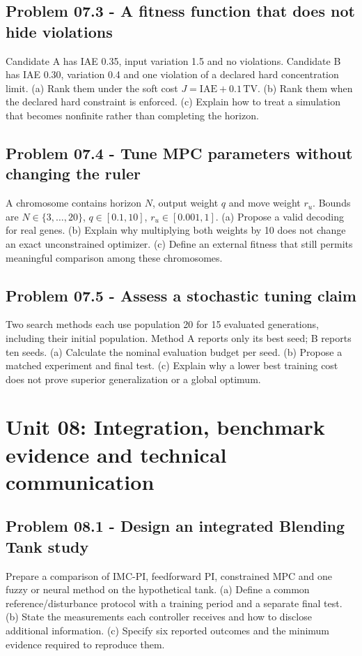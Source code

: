 \documentclass[11pt,a4paper]{article}
\begin{document}
\subsection{Problem 07.3 - A fitness function that does not hide violations}
Candidate A has IAE 0.35, input variation 1.5 and no violations. Candidate B has IAE 0.30, variation 0.4 and one violation of a declared hard concentration limit. (a) Rank them under the soft cost $J=\mathrm{IAE}+0.1\,\mathrm{TV}$. (b) Rank them when the declared hard constraint is enforced. (c) Explain how to treat a simulation that becomes nonfinite rather than completing the horizon.

\subsection{Problem 07.4 - Tune MPC parameters without changing the ruler}
A chromosome contains horizon $N$, output weight $q$ and move weight $r_u$. Bounds are $N\in\{3,\ldots,20\}$, $q\in[0.1,10]$, $r_u\in[0.001,1]$. (a) Propose a valid decoding for real genes. (b) Explain why multiplying both weights by 10 does not change an exact unconstrained optimizer. (c) Define an external fitness that still permits meaningful comparison among these chromosomes.

\subsection{Problem 07.5 - Assess a stochastic tuning claim}
Two search methods each use population 20 for 15 evaluated generations, including their initial population. Method A reports only its best seed; B reports ten seeds. (a) Calculate the nominal evaluation budget per seed. (b) Propose a matched experiment and final test. (c) Explain why a lower best training cost does not prove superior generalization or a global optimum.


\clearpage\section{Unit 08: Integration, benchmark evidence and technical communication}
\subsection{Problem 08.1 - Design an integrated Blending Tank study}
Prepare a comparison of IMC-PI, feedforward PI, constrained MPC and one fuzzy or neural method on the hypothetical tank. (a) Define a common reference/disturbance protocol with a training period and a separate final test. (b) State the measurements each controller receives and how to disclose additional information. (c) Specify six reported outcomes and the minimum evidence required to reproduce them.
\end{document}
